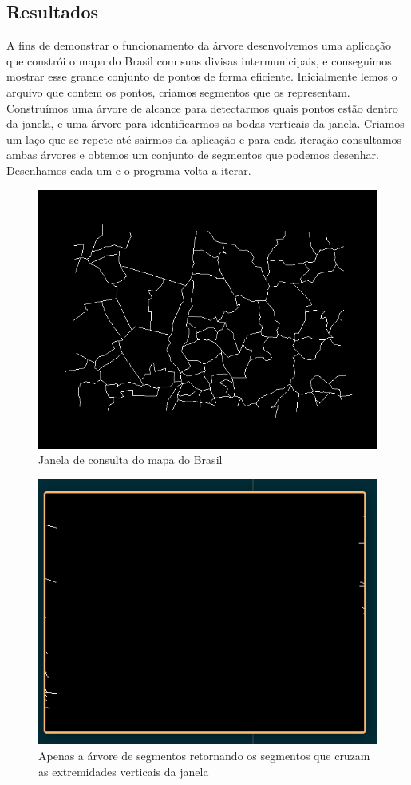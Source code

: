 \subsection{Resultados}
A fins de demonstrar o funcionamento da árvore desenvolvemos uma aplicação que constrói o mapa do Brasil com suas divisas intermunicipais, e conseguimos mostrar esse grande conjunto de pontos de forma eficiente.
Inicialmente lemos o arquivo que contem os pontos, criamos segmentos que os representam. Construímos uma árvore de alcance para detectarmos quais pontos estão dentro da janela, e uma árvore para identificarmos as bodas verticais da janela. Criamos um laço que se repete até sairmos da aplicação e para cada iteração consultamos ambas árvores e obtemos um conjunto de segmentos que podemos desenhar. Desenhamos cada um e o programa volta a iterar.
\begin{figure}
    \centering
    \includegraphics[scale=0.4]{images/Captura de tela de 2021-04-03 19-25-10.png}
    \caption{Janela de consulta do mapa do Brasil}
    \label{fig:execut1}
\end{figure}
\begin{figure}
    \centering
    \includegraphics[scale=0.4]{images/Captura de tela de 2021-04-01 12-10-49.png}
    \caption{Apenas a árvore de segmentos retornando os segmentos que cruzam as extremidades verticais da janela}
    \label{fig:brazil_map_app}
\end{figure}
